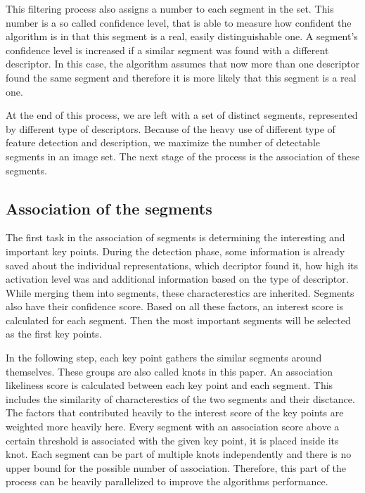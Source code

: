 This filtering process also assigns a number to each segment in the set. This number is a so called confidence level, that is able to measure how confident the algorithm is in that this segment is a real, easily distinguishable one. A segment's confidence level is increased if a similar segment was found with a different descriptor. In this case, the algorithm assumes that now more than one descriptor found the same segment and therefore it is more likely that this segment is a real one. 

At the end of this process, we are left with a set of distinct segments, represented by different type of descriptors. Because of the heavy use of different type of feature detection and description, we maximize the number of detectable segments in an image set. The next stage of the process is the association of these segments.

\subsection{Association of the segments} %

The first task in the association of segments is determining the interesting and important key points. During the detection phase, some information is already saved about the individual representations, which decriptor found it, how high its activation level was and additional information based on the type of descriptor. While merging them into segments, these characterestics are inherited. Segments also have their confidence score. Based on all these factors, an interest score is calculated for each segment. Then the most important segments will be selected as the first key points.

In the following step, each key point gathers the similar segments around themselves. These groups are also called knots in this paper. An association likeliness score is calculated between each key point and each segment. This includes the similarity of characterestics of the two segments and their disctance. The factors that contributed heavily to the interest score of the key points are weighted more heavily here. Every segment with an association score above a certain threshold is associated with the given key point, it is placed inside its knot. Each segment can be part of multiple knots independently and there is no upper bound for the possible number of association. Therefore, this part of the process can be heavily parallelized to improve the algorithms performance.


